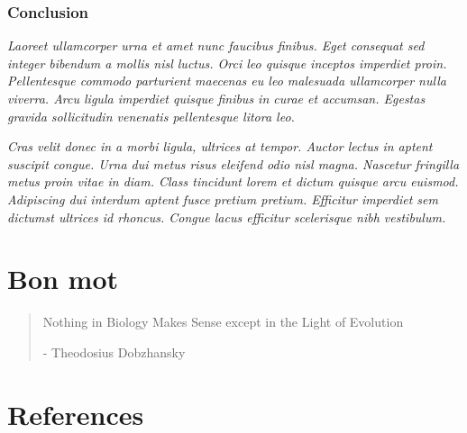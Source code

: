 \documentclass[
  a4paper,
]{scrbook}
\begin{document}
\subsection{Conclusion}\label{conclusion}

\emph{Laoreet ullamcorper urna et amet nunc faucibus finibus. Eget
consequat sed integer bibendum a mollis nisl luctus. Orci leo quisque
inceptos imperdiet proin. Pellentesque commodo parturient maecenas eu
leo malesuada ullamcorper nulla viverra. Arcu ligula imperdiet quisque
finibus in curae et accumsan. Egestas gravida sollicitudin venenatis
pellentesque litora leo.}

\emph{Cras velit donec in a morbi ligula, ultrices at tempor. Auctor
lectus in aptent suscipit congue. Urna dui metus risus eleifend odio
nisl magna. Nascetur fringilla metus proin vitae in diam. Class
tincidunt lorem et dictum quisque arcu euismod. Adipiscing dui interdum
aptent fusce pretium pretium. Efficitur imperdiet sem dictumst ultrices
id rhoncus. Congue lacus efficitur scelerisque nibh vestibulum.}

\chapter{Bon mot}\label{bon-mot}

\begin{quote}
Nothing in Biology Makes Sense except in the Light of Evolution

- Theodosius Dobzhansky
\end{quote}

\chapter{References}\label{references}
\end{document}
